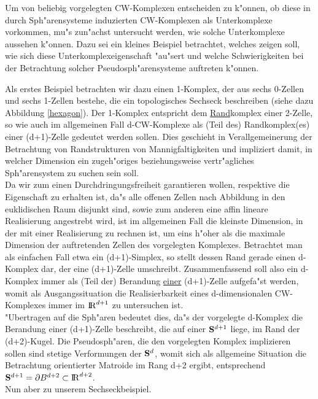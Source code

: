 Um von beliebig vorgelegten CW-Komplexen entscheiden zu k"onnen, ob diese in
durch Sph"a\-rensysteme induzierten CW-Komplexen als Unterkomplexe vorkommen,
mu"s zu\-n"achst untersucht werden, wie solche Unterkomplexe aussehen k"onnen.
Dazu sei ein kleines Beispiel betrachtet, welches zeigen soll, wie sich diese
Unterkomplex\-eigenschaft "au"sert und welche Schwierigkeiten bei der
Betrachtung solcher Pseudosph"arensysteme auftreten k"onnen.

Als erstes Beispiel betrachten wir dazu einen 1-Komplex, der aus sechs 0-Zellen
und sechs 1-Zellen bestehe, die ein topologisches Sechseck beschreiben (siehe
dazu Abbildung \ref{hexagon}). Der 1-Komplex entspricht dem \ul{Rand}komplex
einer 2-Zelle, so wie auch im allgemeinen Fall d-CW-Komplexe als (Teil des)
Randkomplex(es) einer (d+1)-Zelle gedeutet werden sollen. Dies geschieht in
Verallgemeinerung der Betrachtung von Randstrukturen von Mannigfaltigkeiten
und impliziert damit, in welcher Dimension ein zugeh"origes beziehungsweise
vertr"agliches Sph"arensystem zu suchen sein soll.\\
Da wir zum einen Durchdringungsfreiheit garantieren wollen, respektive die
Eigenschaft zu erhalten ist, da"s alle offenen Zellen nach Abbildung in den
euklidischen Raum disjunkt sind, sowie zum anderen eine affin lineare
Realisierung angestrebt wird, ist im allgemeinen Fall die kleinste Dimension,
in der mit einer Realisierung zu rechnen ist, um eins h"oher als die maximale
Dimension der auftretenden Zellen des vorgelegten Komplexes.
Betrachtet man als einfachen Fall etwa ein (d+1)-Simplex, so stellt dessen Rand
gerade einen d-Komplex dar, der eine (d+1)-Zelle umschreibt.
Zusammenfassend soll also ein d-Komplex immer als (Teil der) Berandung
\ul{einer} (d+1)-Zelle aufgefa"st werden, womit als Ausgangssituation die
Realisierbarkeit eines d-dimensionalen CW-Komplexes immer im $\R^{d+1}$ zu
untersuchen ist.\\
"Ubertragen auf die Sph"aren bedeutet dies, da"s der vorgelegte d-Komplex
die Berandung einer (d+1)-Zelle beschreibt, die auf einer $\S^{d+1}$ liege,
im Rand der (d+2)-Kugel. Die Pseudosph"aren, die den vorgelegten Komplex
implizieren sollen sind stetige Verformungen der $\S^d$, womit sich als
allgemeine Situation die Betrachtung orientierter Matroide im Rang d+2 ergibt,
entsprechend $\S^{d+1}=\partial B^{d+2}\subset\R^{d+2}$.\\
Nun aber zu unserem Sechseckbeispiel.

